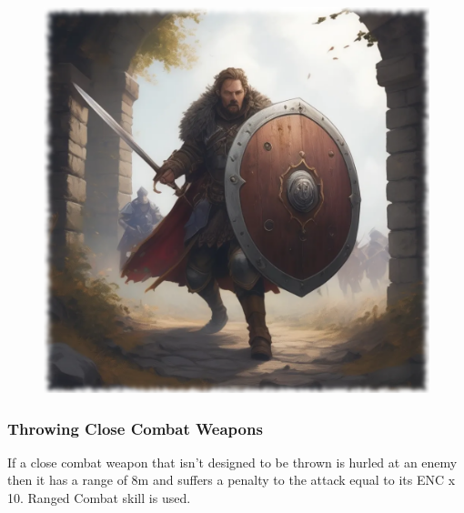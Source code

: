 \begin{figure}[H]
\begin{center}
\includegraphics[scale=0.24]{img/ai-images/warrior-with-shield.png}
\end{center}
\end{figure}

\subsubsection{Throwing Close Combat Weapons}
If a close combat weapon that isn’t designed to be thrown is hurled at an enemy then it has a range of 8m and suffers a penalty to the attack equal to its ENC x 10. Ranged Combat skill is used. 


